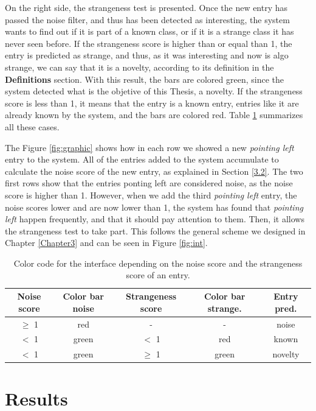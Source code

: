 On the right side, the strangeness test is presented. Once the new entry has passed the noise filter, and thus has been detected as interesting, the system wants to find out if it is part of a known class, or if it is a strange class it has never seen before. If the strangeness score is higher than or equal than 1, the entry is predicted as strange, and thus, as it was interesting and now is algo strange, we can say that it is a novelty, according to its definition in the \textbf{Definitions} section. With this result, the bars are colored green, since the system detected what is the objetive of this Thesis, a novelty. If the strangeness score is less than 1, it means that the entry is a known entry, entries like it are already known by the system, and the bars are colored red. Table \ref{tab:color} summarizes all these cases. 

The Figure \ref{fig:graphic} shows how in each row we showed a new \emph{pointing left} entry to the system. All of the entries added to the system accumulate to calculate the noise score of the new entry, as explained in Section \ref{3.2}. The two first rows show that the entries ponting left are considered noise, as the noise score is higher than 1. However, when we add the third \emph{pointing left} entry, the noise scores lower and are now lower than 1, the system has found that \emph{pointing left} happen frequently, and that it should pay attention to them. Then, it allows the strangeness test to take part. This follows the general scheme we designed in Chapter \ref{Chapter3} and can be seen in Figure \ref{fig:int}. 

\begin{table}[h]
    \begin{tabular}{ c c c c c}
    \hline
    Noise score & Color bar noise & Strangeness score & Color bar strange. & Entry pred. \\ 
    \hline
    $\geq$ 1 & red & - & - & noise\\
    $<$ 1 & green & $<$ 1 & red & known\\
    $<$ 1 & green & $\geq$ 1 & green & novelty\\
    \hline
    \end{tabular}
    \centering
    \caption[Color code for the interface]{ Color code for the interface depending on the noise score and the strangeness score of an entry. \label{tab:color}}
\end{table}

\section{Results}

